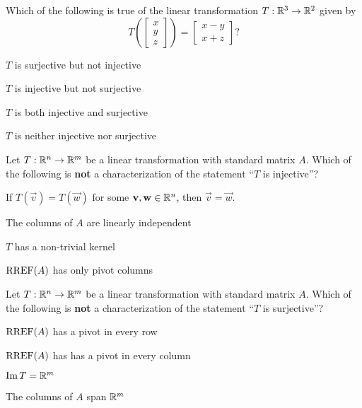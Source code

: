 \documentclass{article}
\begin{document}
\begin{readinessAssuranceTest}
\item Which of the following is true of the linear transformation $T:\mathbb{R}^3 \rightarrow \mathbb{R}^2$ given by $$T\left(\begin{bmatrix} x \\ y \\ z \end{bmatrix} \right) = \begin{bmatrix} x-y \\ x+z \end{bmatrix} ?$$
\begin{readinessAssuranceTestChoices}
\item $T$ is surjective but not injective %
\item $T$ is injective but not surjective
\item $T$ is both injective and surjective
\item $T$ is neither injective nor surjective
\end{readinessAssuranceTestChoices}


\item Let $T: \mathbb{R}^n \rightarrow \mathbb{R}^m$ be a linear transformation with standard matrix $A$.  Which of the following is {\bf not} a characterization of the statement ``$T$ is injective''?
\begin{readinessAssuranceTestChoices}
\item If $T(\vec{v})=T(\vec{w})$ for some $\mathbf{v}, \mathbf{w} \in \mathbb{R}^n$, then $\vec{v}=\vec{w}$.
\item The columns of $A$ are linearly independent
\item $T$ has a non-trivial kernel %
\item $\operatorname{RREF}(A)$ has only pivot columns
\end{readinessAssuranceTestChoices}


\item Let $T: \mathbb{R}^n \rightarrow \mathbb{R}^m$ be a linear transformation with standard matrix $A$.  Which of the following is {\bf not} a characterization of the statement ``$T$ is surjective''?
\begin{readinessAssuranceTestChoices}
\item $\operatorname{RREF}(A)$ has a pivot in every row
\item $\operatorname{RREF}(A)$ has has a pivot in every column %
\item $\operatorname{Im} T = \mathbb{R}^m$
\item The columns of $A$ span $\mathbb{R}^m$
\end{readinessAssuranceTestChoices}


\end{readinessAssuranceTest}
\end{document}
